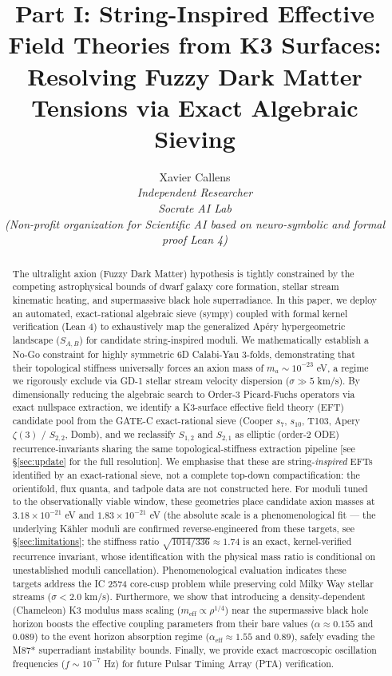 \documentclass[11pt,a4paper]{article}
\title{Part I: String-Inspired Effective Field Theories from K3 Surfaces: Resolving Fuzzy Dark Matter Tensions via Exact Algebraic Sieving}
\author{Xavier Callens \\ \textit{Independent Researcher} \\ \textit{Socrate AI Lab} \\ \textit{(Non-profit organization for Scientific AI based on neuro-symbolic and formal proof Lean 4)}}
\date{}
\begin{document}
\maketitle

\begin{abstract}
The ultralight axion (Fuzzy Dark Matter) hypothesis is tightly constrained by the competing astrophysical bounds of dwarf galaxy core formation, stellar stream kinematic heating, and supermassive black hole superradiance. In this paper, we deploy an automated, exact-rational algebraic sieve (sympy) coupled with formal kernel verification (Lean 4) to exhaustively map the generalized Ap\'{e}ry hypergeometric landscape ($S_{A,B}$) for candidate string-inspired moduli. We mathematically establish a No-Go constraint for highly symmetric 6D Calabi-Yau 3-folds, demonstrating that their topological stiffness universally forces an axion mass of $m_a \sim 10^{-23}$ eV, a regime we rigorously exclude via GD-1 stellar stream velocity dispersion ($\sigma \gg 5$ km/s). By dimensionally reducing the algebraic search to Order-3 Picard-Fuchs operators via exact nullspace extraction, we identify a K3-surface effective field theory (EFT) candidate pool from the GATE-C exact-rational sieve (Cooper $s_7$, $s_{10}$, T103, Apery $\zeta(3)$ / $S_{2,2}$, Domb), and we reclassify $S_{1,2}$ and $S_{2,1}$ as elliptic (order-2 ODE) recurrence-invariants sharing the same topological-stiffness extraction pipeline [see \S\ref{sec:update} for the full resolution]. We emphasise that these are string-\emph{inspired} EFTs identified by an exact-rational sieve, not a complete top-down compactification: the orientifold, flux quanta, and tadpole data are not constructed here. For moduli tuned to the observationally viable window, these geometries place candidate axion masses at $3.18 \times 10^{-21}$ eV and $1.83 \times 10^{-21}$ eV (the absolute scale is a phenomenological fit — the underlying K\"ahler moduli are confirmed reverse-engineered from these targets, see \S\ref{sec:limitations}; the stiffness ratio $\sqrt{1014/336}\approx1.74$ is an exact, kernel-verified recurrence invariant, whose identification with the physical mass ratio is conditional on unestablished moduli cancellation). Phenomenological evaluation indicates these targets address the IC 2574 core-cusp problem while preserving cold Milky Way stellar streams ($\sigma < 2.0$ km/s). Furthermore, we show that introducing a density-dependent (Chameleon) K3 modulus mass scaling ($m_{\text{eff}} \propto \rho^{1/4}$) near the supermassive black hole horizon boosts the effective coupling parameters from their bare values ($\alpha \approx 0.155$ and $0.089$) to the event horizon absorption regime ($\alpha_{\text{eff}} \approx 1.55$ and $0.89$), safely evading the M87* superradiant instability bounds. Finally, we provide exact macroscopic oscillation frequencies ($f \sim 10^{-7}$ Hz) for future Pulsar Timing Array (PTA) verification.
\end{abstract}
\end{document}
